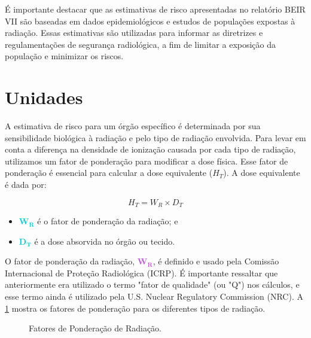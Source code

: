 \documentclass[11pt,a4paper]{article}
\newcounter{exemplo}
\begin{document}
	É importante destacar que as estimativas de risco apresentadas no relatório BEIR VII são baseadas em dados epidemiológicos e estudos de populações expostas à radiação. Essas estimativas são utilizadas para informar as diretrizes e regulamentações de segurança radiológica, a fim de limitar a exposição da população e minimizar os riscos.

\section{Unidades}

	A estimativa de risco para um órgão específico é determinada por sua sensibilidade biológica à radiação e pelo tipo de radiação envolvida. Para levar em conta a diferença na densidade de ionização causada por cada tipo de radiação, utilizamos um fator de ponderação para modificar a dose física. Esse fator de ponderação é essencial para calcular a dose equivalente ($H_T$). A dose equivalente é dada por:
	
		\begin{equation}
			H_T = W_R \times D_T
		\end{equation}

		\begin{exemplo}[onde,]
			\begin{itemize}
				\item \textcolor{DarkTurquoise}{$\mathbf{W_R}$} é o fator de ponderação da radiação; e
				\item \textcolor{DarkTurquoise}{$\mathbf{D_T}$} é a dose absorvida no órgão ou tecido.
			\end{itemize}
		\end{exemplo}

	O fator de ponderação da radiação, \textcolor{MediumOrchid}{$\mathbf{W_R}$}, é definido e usado pela Comissão Internacional de Proteção Radiológica (ICRP). É importante ressaltar que anteriormente era utilizado o termo "fator de qualidade" (ou "Q") nos cálculos, e esse termo ainda é utilizado pela U.S. Nuclear Regulatory Commission (NRC). A \ref{fig:prFatorPesoRadiacao} mostra os fatores de ponderação para os diferentes tipos de radiação. 

		\begin{figure}[!h]
			\centering
			\caption{Fatores de Ponderação de Radiação.}
			\label{fig:prFatorPesoRadiacao}
		\end{figure}
	
\end{document}
